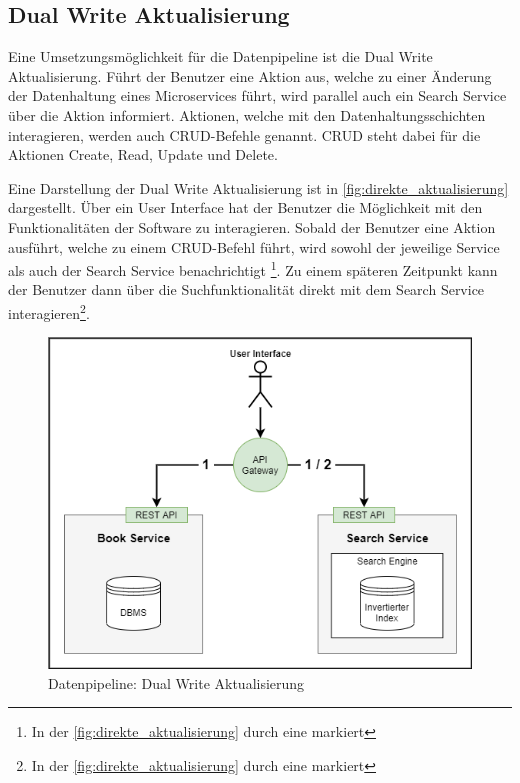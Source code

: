 \subsection{Dual Write Aktualisierung\label{subsec4.1.2:Unterunterpunkt-2}}

Eine Umsetzungsmöglichkeit für die Datenpipeline ist die \glqq Dual Write Aktualisierung\grqq{}. Führt der Benutzer eine Aktion aus, welche zu einer Änderung der Datenhaltung eines Microservices führt, wird parallel auch ein Search Service über die Aktion informiert. Aktionen, welche mit den Datenhaltungsschichten interagieren, werden auch CRUD-Befehle genannt. CRUD steht dabei für die Aktionen \glqq Create\grqq{}, \glqq Read\grqq{}, \glqq Update\grqq{} und \glqq Delete\grqq{}.

Eine Darstellung der \glqq Dual Write Aktualisierung\grqq{} ist in \autoref{fig:direkte_aktualisierung} dargestellt. Über ein User Interface hat der Benutzer die Möglichkeit mit den Funktionalitäten der Software zu interagieren. Sobald der Benutzer eine Aktion ausführt, welche zu einem CRUD-Befehl führt, wird sowohl der jeweilige Service als auch der Search Service benachrichtigt \footnote{In der \autoref{fig:direkte_aktualisierung} durch eine \grqq{} markiert}. Zu einem späteren Zeitpunkt kann der Benutzer dann über die Suchfunktionalität direkt mit dem Search Service interagieren\footnote{In der \autoref{fig:direkte_aktualisierung} durch eine \grqq{} markiert}.

\begin{figure}[H]
    \centering
    \includegraphics[width=0.6\linewidth]{images/direkte_aktualisierung.png}
    \caption{Datenpipeline: Dual Write Aktualisierung}
    \label{fig:direkte_aktualisierung}
\end{figure}

